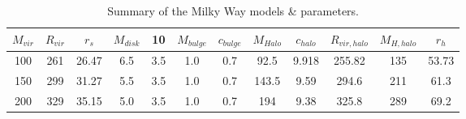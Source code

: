 \begin{table}[H]{\label{tab:MW}}
\begin{center}
\begin{tabular}{c c c c c c c c c c c c}
\hline
\hline
$M_{vir} $ & $R_{vir}$ & $r_s$ & $M_{disk}$ & 10 & $M_{bulge}$ & $c_{bulge} $ & $M_{Halo}$ & $c_{halo}$ & $R_{vir, halo}$ & $M_{H,halo}$ & $r_h $ \\
\hline
100 & 261 & 26.47 & 6.5 & 3.5 & 1.0 & 0.7 & 92.5 & 9.918 & 255.82 & 135 & 53.73 \\
150 & 299 & 31.27 & 5.5 & 3.5 & 1.0 & 0.7 & 143.5 & 9.59 & 294.6 & 211  & 61.3 \\
200 & 329 & 35.15 & 5.0 & 3.5 & 1.0 & 0.7 & 194 & 9.38 & 325.8 & 289 & 69.2 \\
\hline
\end{tabular}
\caption{Summary of the Milky Way models \& parameters.\label{tab:MWmodels}}
\end{center}
\end{table}












